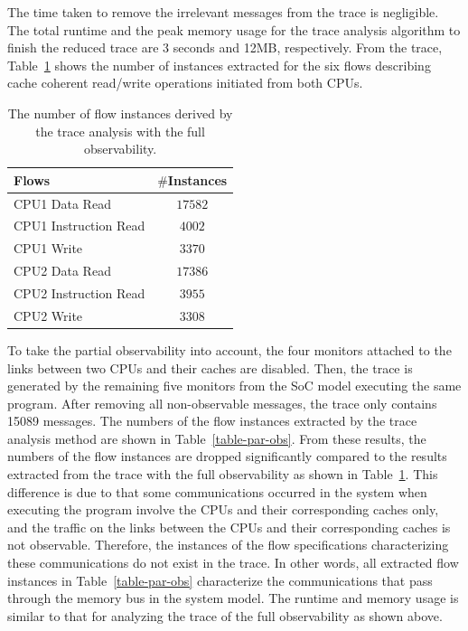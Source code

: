 \documentclass[conference]{IEEEtran}
\begin{document}
The time taken to remove the irrelevant messages from the trace is negligible.  The total runtime and the peak memory usage for the trace analysis algorithm to finish the reduced trace are 3 seconds and 12MB, respectively.  From the trace, Table~\ref{table-case-2} shows the number of instances extracted for the six flows describing cache coherent read/write operations initiated from both CPUs. 
\begin{table}[tb]
\caption{The number of flow instances derived by the trace analysis with the full observability.}
\begin{center}
\begin{tabular}{|l|c|}
\hline
Flows & $\#$Instances \\
\hline
\hline
CPU1 Data Read			&  $17582$\\
CPU1 Instruction Read		&  $4002$\\
CPU1 Write				&  $3370$\\
\hline
CPU2 Data Read			&  $17386$\\
CPU2 Instruction Read		&  $3955$\\
CPU2 Write				&  $3308$\\
\hline
\end{tabular}
\end{center}
\label{table-case-2}
\end{table}%

To take the partial observability into account, the four monitors attached to the links between two CPUs and their caches are disabled. Then, the trace is generated by the remaining five monitors from the SoC model executing the same program. After removing all non-observable messages, the trace only contains 15089 messages. The numbers of the flow instances extracted by the trace analysis method are shown in Table~\ref{table-par-obs}.  From these results, the numbers of the flow instances are dropped significantly compared to the results extracted from the trace with the full observability as shown in Table~\ref{table-case-2}. This difference is due to that some communications occurred in the system when executing the program involve the CPUs and their corresponding caches only, and the traffic on the links between the CPUs and their corresponding caches is not observable. Therefore, the instances of the flow specifications characterizing these communications do not exist in the trace. In other words, all extracted flow instances in Table~\ref{table-par-obs} characterize the communications that pass through the memory bus in the system model.  The runtime and memory usage is similar to that for analyzing the trace of the full observability as shown above.
\end{document}
